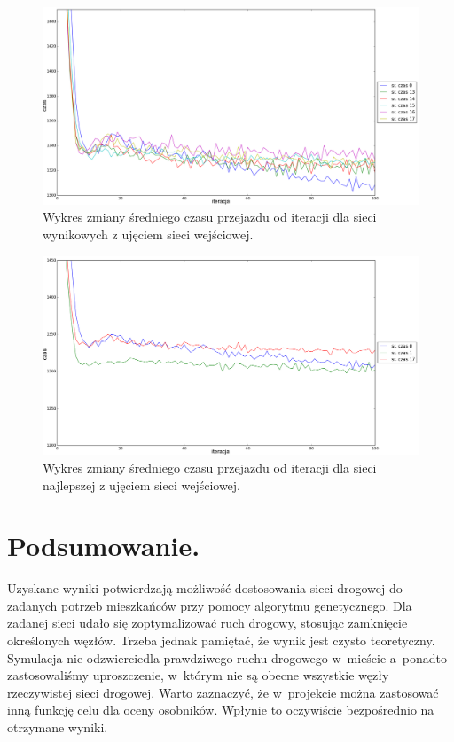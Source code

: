 \documentclass[twoside,12pt]{report}
\let\oldsection\chapter
\def\chapter{\cleardoublepage\oldsection}
\begin{document}
\begin{figure}[ht]
\centering
\includegraphics[width=1\textwidth]{img/iters/iters4}
\caption{Wykres zmiany średniego czasu przejazdu od iteracji dla sieci wynikowych z ujęciem sieci wejściowej.}
\label{iters4}
\end{figure}

\begin{figure}[ht]
\centering
\includegraphics[width=1\textwidth]{img/iters/iters5}
\caption{Wykres zmiany średniego czasu przejazdu od iteracji dla sieci najlepszej z ujęciem sieci wejściowej.}
\label{iters5}
\end{figure}

\chapter{Podsumowanie.}\label{rozdz.podsumowanie} 
Uzyskane wyniki potwierdzają możliwość dostosowania sieci drogowej do zadanych potrzeb mieszkańców przy pomocy algorytmu genetycznego. Dla zadanej sieci udało się zoptymalizować ruch drogowy, stosując zamknięcie określonych węzłów. Trzeba jednak pamiętać, że wynik jest czysto teoretyczny. Symulacja nie odzwierciedla prawdziwego ruchu drogowego w~mieście a~ponadto zastosowaliśmy uproszczenie, w~którym nie są obecne wszystkie węzły rzeczywistej sieci drogowej. Warto zaznaczyć, że w~projekcie można zastosować inną funkcję celu dla oceny osobników. Wpłynie to oczywiście bezpośrednio na otrzymane wyniki.
\end{document}
